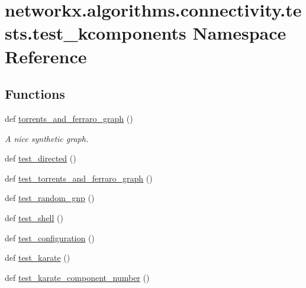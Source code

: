 \hypertarget{namespacenetworkx_1_1algorithms_1_1connectivity_1_1tests_1_1test__kcomponents}{}\section{networkx.\+algorithms.\+connectivity.\+tests.\+test\+\_\+kcomponents Namespace Reference}
\label{namespacenetworkx_1_1algorithms_1_1connectivity_1_1tests_1_1test__kcomponents}
\subsection*{Functions}
\begin{DoxyCompactItemize}
\item 
def \hyperlink{namespacenetworkx_1_1algorithms_1_1connectivity_1_1tests_1_1test__kcomponents_a53b04961bdefdfd4e0642e0e943572c3}{torrents\+\_\+and\+\_\+ferraro\+\_\+graph} ()
\begin{DoxyCompactList}\small\item\em A nice synthetic graph. \end{DoxyCompactList}\item 
def \hyperlink{namespacenetworkx_1_1algorithms_1_1connectivity_1_1tests_1_1test__kcomponents_a66db3634794c333cbfa35ef186934969}{test\+\_\+directed} ()
\item 
def \hyperlink{namespacenetworkx_1_1algorithms_1_1connectivity_1_1tests_1_1test__kcomponents_ae24ab98ea5bdb7fc9a52459f2387a3fc}{test\+\_\+torrents\+\_\+and\+\_\+ferraro\+\_\+graph} ()
\item 
def \hyperlink{namespacenetworkx_1_1algorithms_1_1connectivity_1_1tests_1_1test__kcomponents_a82cb0f7dc9e12b1b42062d224738563e}{test\+\_\+random\+\_\+gnp} ()
\item 
def \hyperlink{namespacenetworkx_1_1algorithms_1_1connectivity_1_1tests_1_1test__kcomponents_a249e4bf5eb113501ab96be2ad141c117}{test\+\_\+shell} ()
\item 
def \hyperlink{namespacenetworkx_1_1algorithms_1_1connectivity_1_1tests_1_1test__kcomponents_a80a2b88fa14e5a23ca9170636e73520b}{test\+\_\+configuration} ()
\item 
def \hyperlink{namespacenetworkx_1_1algorithms_1_1connectivity_1_1tests_1_1test__kcomponents_ae7531cccd5c3d97a439eba5a6b156688}{test\+\_\+karate} ()
\item 
def \hyperlink{namespacenetworkx_1_1algorithms_1_1connectivity_1_1tests_1_1test__kcomponents_a57f67e1cc59b7d639f28cf3a15a0e04c}{test\+\_\+karate\+\_\+component\+\_\+number} ()

\end{DoxyCompactItemize}
